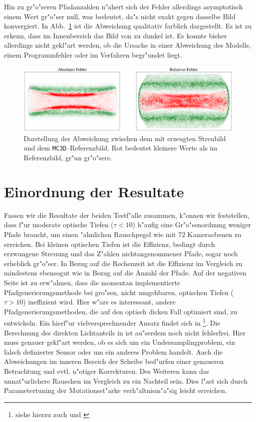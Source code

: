 	Hin zu gr"o"seren Pfadanzahlen n"ahert sich der Fehler allerdings asymptotisch einem Wert gr"o"ser null, was bedeutet, da"s \pirate nicht exakt gegen dasselbe Bild konvergiert. In Abb.~\ref{fig:resdiskplot} ist die Abweichung qualitativ farblich dargestellt. Es ist zu erkenn, dass im Innenbereich das Bild von \pirate zu dunkel ist. Es konnte bisher allerdings nicht gekl"art werden, ob die Ursache in einer Abweichung des Modells, einem Programmfehler oder im Verfahren begr"undet liegt.
	
		\begin{figure}
			\centering
			\includegraphics[width=1.0\textwidth]{resdiskplot.eps}
			\caption{Darstellung der Abweichung zwischen dem mit \pirate erzeugten Streubild und dem \texttt{MC3D}--Referenzbild. Rot bedeutet kleinere Werte als im Referenzbild, gr"un gr"o"sere.}
			\label{fig:resdiskplot}
		\end{figure}
	

	\section{Einordnung der Resultate}
	Fassen wir die Resultate der beiden Testf"alle zusammen, k"onnen wir feststellen, dass \pirate f"ur moderate optische Tiefen ($\tau < 10$) h"aufig eine Gr"o"senordnung weniger Pfade braucht, um einen "ahnlichen Rauschpegel wie \mctd mit 72 Kameraebenen zu erreichen. Bei kleinen optischen Tiefen ist die Effizienz, bedingt durch erzwungene Streuung und das Z"ahlen nichtangenommener Pfade, sogar noch erheblich gr"o"ser. In Bezug auf die Rechenzeit ist die Effizienz im Vergleich zu \mctd mindestens ebensogut wie in Bezug auf die Anzahl der Pfade. Auf der negativen Seite ist zu erw"ahnen, dass die momentan implementierte Pfadgenerierungsmethode bei gro"sen, nicht umgehbaren, optischen Tiefen ($\tau>10$) ineffizient wird. Hier w"are es interessant, andere Pfadgenerierungsmethoden, die auf den optisch dicken Fall optimiert sind, zu entwickeln. Ein hierf"ur vielversprechnender Ansatz findet sich in \citet{Laszlo:2005p11056}\footnote{siehe hierzu auch \citep{DAldous:1994p11528} und \citep{Grassberger:2002p10876}}. Die Berechnung des direkten Lichtanteils in \pirate ist au"serdem noch nicht fehlerfrei. Hier muss genauer gekl"art werden, ob es sich um ein Undersamplingproblem, ein falsch definierter Sensor oder um ein anderes Problem handelt. Auch die Abweichungen im inneren Bereich der Scheibe bed"urfen einer genaueren Betrachtung und evtl. n"otiger Korrekturen. Des Weiteren kann das unnat"urlichere Rauschen im Vergleich zu \mctd ein Nachteil sein. Dies l"ast sich durch Parametertuning der Mutationsst"arke verh"altnism"a"sig leicht erreichen.
	
